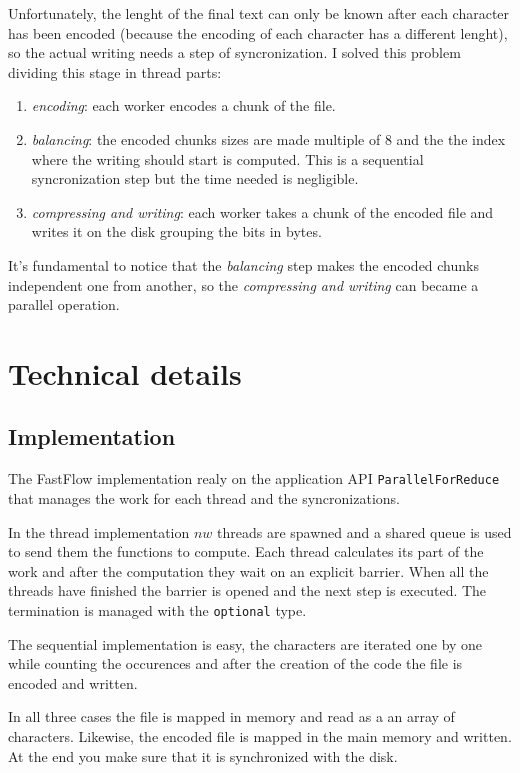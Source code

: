 \documentclass[12pt, letterpaper]{article}
\begin{document}
Unfortunately, the lenght of the final text can only be known after each character has been encoded (because the encoding of each character
has a different lenght), so the actual writing needs a step of syncronization. I solved this problem dividing this stage in thread parts:
\begin{enumerate}
    \item \textit{encoding}: each worker encodes a chunk of the file.
    \item \textit{balancing}: the encoded chunks sizes are made multiple of 8 and the the index where the writing should start is computed. This is a sequential syncronization step but the time needed is negligible.
    \item \textit{compressing and writing}: each worker takes a chunk of the encoded file and writes it on the disk grouping the bits in bytes.
\end{enumerate}
It's fundamental to notice that the \textit{balancing} step makes the encoded chunks independent one from another, so the \textit{compressing and writing} can became a parallel operation.


\section{Technical details}

\subsection{Implementation}

The FastFlow implementation realy on the application API \texttt{ParallelForReduce} that manages the work for each thread and the syncronizations.

In the thread implementation $nw$ threads are spawned and a shared queue is used to send them the functions to compute. Each thread calculates its part of the work and after the computation they wait on an explicit barrier. When all the threads have finished the barrier is opened and the next step is executed. The termination is managed with the \texttt{optional} type.

The sequential implementation is easy, the characters are iterated one by one while counting the occurences and after the creation of the code the file is encoded and written.

In all three cases the file is mapped in memory and read as a an array of characters. Likewise, the encoded file is mapped in the main memory and written. At the end you make sure that it is synchronized with the disk.
\end{document}
